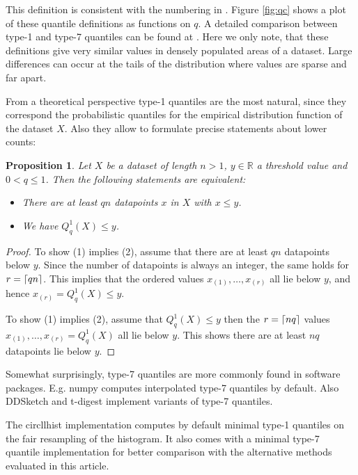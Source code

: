 \documentclass{article}
\DeclarePairedDelimiter{\ceil}{\lceil}{\rceil}
\theoremstyle{plain}
\newtheorem{proposition}[definition]{Proposition}
\theoremstyle{remark}
\newcommand{\IR}{\mathbb{R}}
\begin{document}
This definition is consistent with the numbering in \cite{HF1996}.
Figure \ref{fig:qc} shows a plot of these quantile definitions as functions on $q$.
A detailed comparison between type-1 and type-7 quantiles can be found at \cite{HH19}.
Here we only note, that these definitions give very similar values in densely populated areas of a dataset.
Large differences can occur at the tails of the distribution where values are sparse and far apart.

From a theoretical perspective type-1 quantiles are the most natural, since they correspond the
probabilistic quantiles for the empirical distribution function of the dataset $X$.
Also they allow to formulate precise statements about lower counts:

\begin{proposition}
  Let $X$ be a dataset of length $n > 1$, $y \in \IR$ a threshold value and $0 < q \leq 1$.
  Then the following statements are equivalent:
  \begin{itemize}
  \item[(1)] There are at least $q n$ datapoints $x$ in $X$ with $x \leq y$.
  \item[(2)] We have $Q^1_q(X) \leq y$.
  \end{itemize}
\end{proposition}

\begin{proof}
  To show (1) implies (2), assume that there are at least $q n$ datapoints below $y$.
  Since the number of datapoints is always an integer, the same holds for $r = \ceil{q n}$.
  This implies that the ordered values $x_{(1)}, \dots, x_{(r)}$ all lie below $y$,
  and hence $x_{(r)} = Q^1_q(X) \leq y$.

  To show (1) implies (2), assume that $Q^1_q(X) \leq y$ then the $r = \ceil{n q}$ values $x_{(1)},
  \dots, x_{(r)} = Q^1_q(X)$ all lie below $y$. This shows there are at least $n q$
  datapoints lie below $y$.
\end{proof}

Somewhat surprisingly, type-7 quantiles are more commonly found in software packages.
E.g. numpy \cite{numpy} computes interpolated type-7 quantiles by default.
Also DDSketch \cite{dd} and t-digest \cite{tdigest} implement variants of type-7 quantiles.

The circllhist implementation computes by default minimal type-1 quantiles on the fair resampling of
the histogram.  It also comes with a minimal type-7 quantile implementation for better comparison
with the alternative methods evaluated in this article.
\end{document}
